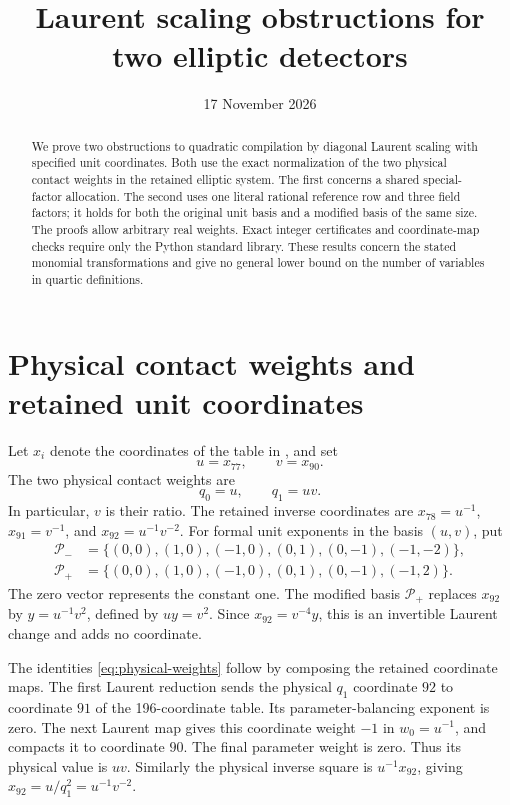 \documentclass[11pt,a4paper]{article}
\title{Laurent scaling obstructions for two elliptic detectors}
\author{}\date{17 November 2026}
\begin{document}
\maketitle
\begin{abstract}
We prove two obstructions to quadratic compilation by diagonal Laurent
scaling with specified unit coordinates. Both use the exact normalization
of the two physical contact weights in the retained elliptic system.
The first concerns a shared special-factor allocation. The second uses
one literal rational reference row and three field factors; it holds
for both the original unit basis and a modified basis of the same size.
The proofs allow arbitrary real weights. Exact integer certificates and
coordinate-map checks require only the Python standard library.
These results concern the stated monomial transformations and give no
general lower bound on the number of variables in quartic definitions.
\end{abstract}

\section{Physical contact weights and retained unit coordinates}

Let $x_i$ denote the coordinates of the table in \cite{Quartic}, and set
\[
                         u=x_{77},\qquad v=x_{90}.
\]
The two physical contact weights are
\begin{equation}\label{eq:physical-weights}
                         q_0=u,\qquad q_1=uv.
\end{equation}
In particular, $v$ is their ratio. The retained inverse coordinates are
$x_{78}=u^{-1}$, $x_{91}=v^{-1}$, and $x_{92}=u^{-1}v^{-2}$.
For formal unit exponents in the basis $(u,v)$, put
\[
\begin{aligned}
\mathcal P_-&=\{(0,0),(1,0),(-1,0),(0,1),(0,-1),(-1,-2)\},\\
\mathcal P_+&=\{(0,0),(1,0),(-1,0),(0,1),(0,-1),(-1,2)\}.
\end{aligned}
\]
The zero vector represents the constant one. The modified basis
$\mathcal P_+$ replaces $x_{92}$ by $y=u^{-1}v^2$, defined by
$uy=v^2$. Since $x_{92}=v^{-4}y$, this is an invertible Laurent
change and adds no coordinate.

The identities \eqref{eq:physical-weights} follow by composing the
retained coordinate maps. The first Laurent reduction sends the
physical $q_1$ coordinate $92$ to coordinate $91$ of the
196-coordinate table. Its parameter-balancing exponent is zero.
The next Laurent map gives this coordinate weight $-1$ in
$w_0=u^{-1}$, and compacts it to coordinate $90$. The final
parameter weight is zero. Thus its physical value is $uv$.
Similarly the physical inverse square is $u^{-1}x_{92}$, giving
$x_{92}=u/q_1^2=u^{-1}v^{-2}$.
\end{document}
